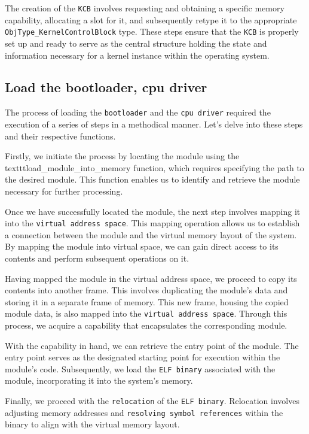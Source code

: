 The creation of the \texttt{KCB} involves requesting and obtaining a specific memory capability, allocating a slot for it, and subsequently retype it to the appropriate \texttt{ObjType\_KernelControlBlock} type. These steps ensure that the \texttt{KCB} is properly set up and ready to serve as the central structure holding the state and information necessary for a kernel instance within the operating system.

\subsection{Load the bootloader, cpu driver}

The process of loading the \texttt{bootloader} and the \texttt{cpu driver} required the execution of a series of steps in a methodical manner. Let's delve into these steps and their respective functions.

Firstly, we initiate the process by locating the module using the \\texttt{load\_module\_into\_memory} function, which requires specifying the path to the desired module. This function enables us to identify and retrieve the module necessary for further processing.

Once we have successfully located the module, the next step involves mapping it into the \texttt{virtual address space}. This mapping operation allows us to establish a connection between the module and the virtual memory layout of the system. By mapping the module into virtual space, we can gain direct access to its contents and perform subsequent operations on it.

Having mapped the module in the virtual address space, we proceed to copy its contents into another frame. This involves duplicating the module's data and storing it in a separate frame of memory. This new frame, housing the copied module data, is also mapped into the \texttt{virtual address space}. Through this process, we acquire a capability that encapsulates the corresponding module.

With the capability in hand, we can retrieve the entry point of the module. The entry point serves as the designated starting point for execution within the module's code. Subsequently, we load the \texttt{ELF binary} associated with the module, incorporating it into the system's memory.

Finally, we proceed with the \texttt{relocation} of the \texttt{ELF binary}. Relocation involves adjusting memory addresses and \texttt{resolving symbol references} within the binary to align with the virtual memory layout. 

